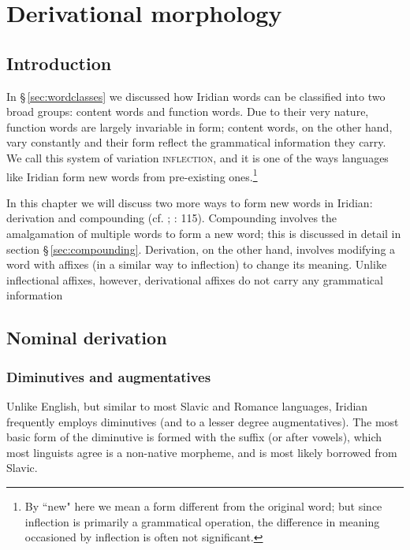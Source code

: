 \chapter{Derivational morphology}

\section{Introduction}

In \S\,\ref{sec:wordclasses} we discussed how Iridian words can be classified
into two broad groups: content words and function
words. Due to their very nature, function words are largely
invariable in form; content words, on the other hand, vary constantly and their
form reflect the grammatical information they carry. We call this system of
variation {\scshape inflection}, and it is one of the ways
languages like Iridian form new words from pre-existing ones.\footnote{By ``new"
here we mean a form different from the original word; but since inflection is
primarily a grammatical operation, the difference in meaning occasioned by
inflection is often not significant.}

In this chapter we will discuss two more ways to form new words in Iridian: {\sc
derivation} and {\sc compounding} (cf.
\cite{booij2005}; \cite{velupillai2012}: 115). Compounding involves the
amalgamation of multiple words to form a new word; this is discussed in detail
in section \S\,\ref{sec:compounding}. Derivation, on the other hand, involves
modifying a word with affixes (in a similar way to inflection) to change its
meaning. Unlike inflectional affixes, however, derivational affixes do not carry
any grammatical information

\section{Nominal derivation}
\subsection{Diminutives and augmentatives}\label{sec:diminutive}

Unlike English, but similar to most Slavic and Romance languages, Iridian frequently
employs {\sc diminutives} (and to a lesser degree {\sc augmentatives}). The most
basic form of the diminutive is formed with the suffix  (or 
after vowels), which most linguists agree is a non-native
morpheme, and is most likely borrowed from Slavic.

